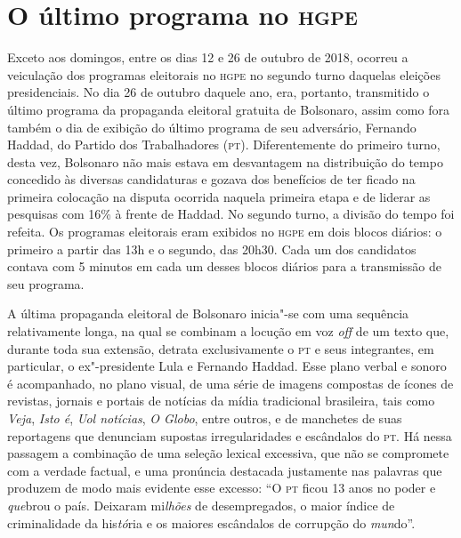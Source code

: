\section{O último programa no \textsc{hgpe}}

Exceto aos domingos, entre os dias 12 e 26 de outubro de 2018, ocorreu a
veiculação dos programas eleitorais no \textsc{hgpe} no segundo turno daquelas
eleições presidenciais. No dia 26 de outubro daquele ano, era, portanto,
transmitido o último programa da propaganda eleitoral gratuita de
Bolsonaro, assim como fora também o dia de exibição do último programa
de seu adversário, Fernando Haddad, do Partido dos Trabalhadores (\textsc{pt}).
Diferentemente do primeiro turno, desta vez, Bolsonaro não mais estava
em desvantagem na distribuição do tempo concedido às diversas
candidaturas e gozava dos benefícios de ter ficado na primeira colocação
na disputa ocorrida naquela primeira etapa e de liderar as pesquisas com
16\% à frente de Haddad. No segundo turno, a divisão do tempo foi
refeita. Os programas eleitorais eram exibidos no \textsc{hgpe} em dois blocos
diários: o primeiro a partir das 13h e o segundo, das 20h30. Cada um dos
candidatos contava com 5 minutos em cada um desses blocos diários para a
transmissão de seu programa.

A última propaganda eleitoral de Bolsonaro inicia"-se com uma sequência
relativamente longa, na qual se combinam a locução em voz \emph{off} de
um texto que, durante toda sua extensão, detrata exclusivamente o \textsc{pt} e
seus integrantes, em particular, o ex"-presidente Lula e Fernando Haddad.
Esse plano verbal e sonoro é acompanhado, no plano visual, de uma série
de imagens compostas de ícones de revistas, jornais e portais de
notícias da mídia tradicional brasileira, tais como \emph{Veja},
\emph{Isto é}, \emph{Uol notícias}, \emph{O Globo}, entre outros, e de
manchetes de suas reportagens que denunciam supostas irregularidades e
escândalos do \textsc{pt}. Há nessa passagem a combinação de uma seleção lexical
excessiva, que não se compromete com a verdade factual, e uma pronúncia
destacada justamente nas palavras que produzem de modo mais evidente
esse excesso: ``O \textsc{pt} ficou 13 anos no poder e \emph{que}brou o país.
Deixaram mi\emph{lhões} de desempregados, o maior índice de
criminalidade da his\emph{tó}ria e os maiores escândalos de corrupção do
\emph{mun}do''.

